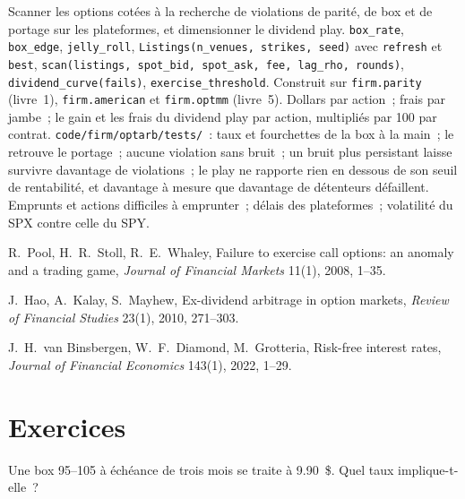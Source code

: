 \begin{build}
 Scanner les options cotées à la recherche de violations de parité, de box et de portage sur les plateformes, et dimensionner le dividend play.
 \texttt{box\_rate}, \texttt{box\_edge}, \texttt{jelly\_roll}, \texttt{Listings(n\_venues, strikes, seed)} avec \texttt{refresh}
et \texttt{best}, \texttt{scan(listings, spot\_bid, spot\_ask, fee, lag\_rho, rounds)}, \texttt{dividend\_curve(fails)},
\texttt{exercise\_threshold}. Construit sur \texttt{firm.parity} (livre~1), \texttt{firm.american} et \texttt{firm.optmm} (livre~5).
 Dollars par action~; frais par jambe~; le gain et les frais du dividend play par action, multipliés par 100 par contrat.
 \texttt{code/firm/optarb/tests/}~: taux et fourchettes de la box à la main~; le  retrouve le portage~; aucune violation sans bruit~;
un bruit plus persistant laisse survivre davantage de violations~; le play ne rapporte rien en dessous de son seuil de rentabilité, et davantage à mesure que davantage de détenteurs défaillent.
 Emprunts et actions difficiles à emprunter~; délais des plateformes~; volatilité du SPX contre celle du SPY.
\end{build}

\begin{omsources}
\item R.~Pool, H.~R.~Stoll, R.~E.~Whaley, Failure to exercise call options: an anomaly and a trading game, \emph{Journal of Financial Markets}
11(1), 2008, 1--35.
\item J.~Hao, A.~Kalay, S.~Mayhew, Ex-dividend arbitrage in option markets, \emph{Review of Financial Studies} 23(1), 2010, 271--303.
\item J.~H.~van Binsbergen, W.~F.~Diamond, M.~Grotteria, Risk-free interest rates, \emph{Journal of Financial Economics} 143(1), 2022, 1--29.
\end{omsources}

\section{Exercices}

\begin{exercise}[$\star$]\label{exo:hf:options-cross-venue-and-volatility-arbitrage-at-speed:1}
Une box 95--105 à échéance de trois mois se traite à 9.90~\$. Quel taux implique-t-elle~?
\end{exercise}

